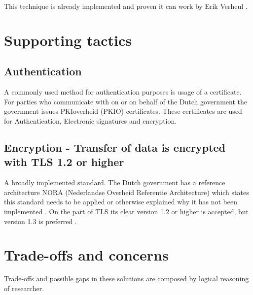 This technique is already implemented and proven it can work by Erik Verheul \cite{VerheuleID}.

\section{Supporting tactics}

\subsection{Authentication} \label{authentication}
A commonly used method for authentication purposes is usage of a certificate. For parties who communicate with on or on behalf of the Dutch government the government issues PKIoverheid (PKIO) certificates. These certificates are used for Authentication, Electronic signatures and encryption. \cite{Logius_PKIO}

\subsection{Encryption - Transfer of data is encrypted with TLS 1.2 or higher} \label{encryption}
A broadly implemented standard. The Dutch government has a reference architecture NORA (Nederlandse Overheid Referentie Architecture) \cite{NORA} which states this standard needs to be applied or otherwise explained why it has not been implemented \cite{NORA_PasToeOfLegUit}. On the part of TLS its clear version 1.2 or higher is accepted, but version 1.3 is preferred \cite{NORA_TLS}. 

\section{Trade-offs and concerns}
Trade-offs and possible gaps in these solutions are composed by logical reasoning of researcher. 

